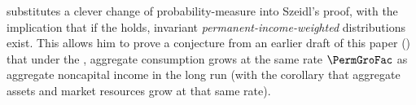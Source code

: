\documentclass[BufferStockTheory]{subfiles}
\begin{document}
\hypertarget{Growth-Rates-of-Aggregate-Income-and-Consumption}{}

\cite{harmenbergInvariant} substitutes a clever change of probability-measure into Szeidl's proof, with the implication that if the {\GICRaw} holds, invariant \emph{permanent-income-weighted} distributions exist.  %
This allows him to prove a conjecture from an earlier draft of this paper (\cite{BufferStockTheoryQESubmit}) that under the {\GICRaw}, aggregate consumption grows at the same rate $\PermGroFac$ as aggregate noncapital income in the long run (with the corollary that aggregate assets and market resources grow at that same rate). \hypertarget{test-Harmenbergs-method}{}
\end{document}
